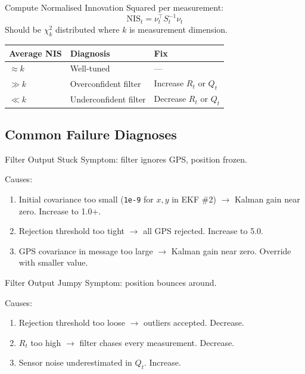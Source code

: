 \documentclass[11pt,a4paper]{article}
\begin{document}
Compute Normalised Innovation Squared per measurement:
\[
\mathrm{NIS}_t = \nu_t^\top S_t^{-1} \nu_t
\]
Should be $\chi^2_k$ distributed where $k$ is measurement dimension.

\begin{center}
\begin{tabular}{lll}
\toprule
\textbf{Average NIS} & \textbf{Diagnosis} & \textbf{Fix} \\
\midrule
$\approx k$ & Well-tuned & --- \\
$\gg k$ & Overconfident filter & Increase $R_t$ or $Q_t$ \\
$\ll k$ & Underconfident filter & Decrease $R_t$ or $Q_t$ \\
\bottomrule
\end{tabular}
\end{center}

\subsection{Common Failure Diagnoses}

\begin{warnbox}{Filter Output Stuck}
Symptom: filter ignores GPS, position frozen.

Causes:
\begin{enumerate}
\item Initial covariance too small (\texttt{1e-9} for $x, y$ in EKF \#2) $\to$ Kalman gain near zero. Increase to 1.0+.
\item Rejection threshold too tight $\to$ all GPS rejected. Increase to 5.0.
\item GPS covariance in message too large $\to$ Kalman gain near zero. Override with smaller value.
\end{enumerate}
\end{warnbox}

\begin{warnbox}{Filter Output Jumpy}
Symptom: position bounces around.

Causes:
\begin{enumerate}
\item Rejection threshold too loose $\to$ outliers accepted. Decrease.
\item $R_t$ too high $\to$ filter chases every measurement. Decrease.
\item Sensor noise underestimated in $Q_t$. Increase.
\end{enumerate}
\end{warnbox}
\end{document}
